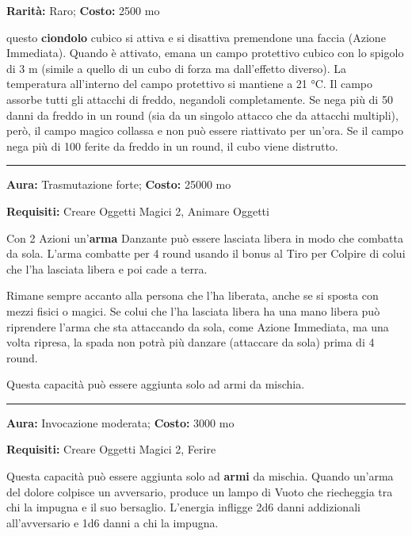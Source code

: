 \begin{multicols}{2}
\textbf{Rarità:} Raro; \textbf{Costo:} 2500 mo

questo \textbf{ciondolo} cubico si attiva e si disattiva premendone una faccia (Azione Immediata). Quando è attivato, emana un campo protettivo cubico con lo spigolo di 3 m (simile a quello di un cubo di forza ma dall'effetto diverso). La temperatura all'interno del campo protettivo si mantiene a 21 °C. Il campo assorbe tutti gli attacchi di freddo, negandoli completamente. Se nega più di 50 danni da freddo in un round (sia da un singolo attacco che da attacchi multipli), però, il campo magico collassa e non può essere riattivato per un'ora. Se il campo nega più di 100 ferite da freddo in un round, il cubo viene distrutto.

\smallskip\noindent\rule{\linewidth}{2pt}  \hypertarget{Danzante}{}\smallskip{}\noindent\label{Danzante}

\textbf{Aura:} Trasmutazione forte; \textbf{Costo:} 25000 mo

\textbf{Requisiti:} Creare Oggetti Magici 2, Animare Oggetti

Con 2 Azioni un'\textbf{arma} Danzante può essere lasciata libera in modo che combatta da sola. L'arma combatte per 4 round usando il bonus al Tiro per Colpire di colui che l'ha lasciata libera e poi cade a terra.

Rimane sempre accanto alla persona che l'ha liberata, anche se si sposta con mezzi fisici o magici. Se colui che l'ha lasciata libera ha una mano libera può riprendere l'arma che sta attaccando da sola, come Azione Immediata, ma una volta ripresa, la spada non potrà più danzare (attaccare da sola) prima di 4 round.

Questa capacità può essere aggiunta solo ad armi da mischia.

\smallskip\noindent\rule{\linewidth}{2pt}  \hypertarget{deldolore}{}\smallskip{}\noindent\label{deldolore}

\textbf{Aura:} Invocazione moderata; \textbf{Costo:} 3000 mo

\textbf{Requisiti:} Creare Oggetti Magici 2, Ferire

Questa capacità può essere aggiunta solo ad \textbf{armi} da mischia. Quando un'arma del dolore colpisce un avversario, produce un lampo di Vuoto che riecheggia tra chi la impugna e il suo bersaglio. L'energia infligge 2d6 danni addizionali all'avversario e 1d6 danni a chi la impugna.


\end{multicols}
